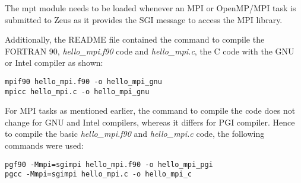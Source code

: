 The mpt module needs to be loaded whenever an MPI or OpenMP/MPI task is submitted to Zeus as it provides the SGI message to access the MPI library.

Additionally, the README file contained the command to compile the FORTRAN 90, \emph{hello\_mpi.f90} code and \emph{hello\_mpi.c}, the C code with the 
GNU or Intel compiler as shown:

\begin{tcolorbox}
\begin{Verbatim}[fontsize=\scriptsize]
mpif90 hello_mpi.f90 -o hello_mpi_gnu
mpicc hello_mpi.c -o hello_mpi_gnu
\end{Verbatim}
\end{tcolorbox}

For MPI tasks as mentioned earlier, the command to compile the code does not change for GNU and Intel compilers, whereas it differs for PGI compiler.
Hence to compile the basic \emph{hello\_mpi.f90} and \emph{hello\_mpi.c} code, the following commands were used:

\begin{tcolorbox}
\begin{Verbatim}[fontsize=\scriptsize]
pgf90 -Mmpi=sgimpi hello_mpi.f90 -o hello_mpi_pgi
pgcc -Mmpi=sgimpi hello_mpi.c -o hello_mpi_c 
\end{Verbatim}
\end{tcolorbox}
